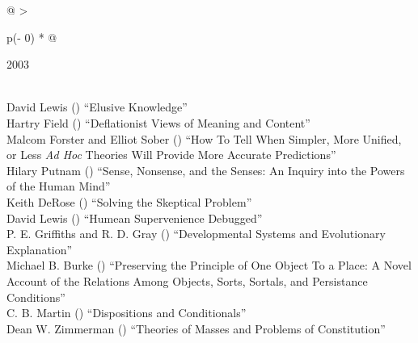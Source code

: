 \documentclass[
  10pt,
  letterpaper,
  DIV=11,
  numbers=noendperiod,
  twoside]{scrartcl}
\begin{document}
\begin{longtable}[]{@{}
  >{\raggedright\arraybackslash}p{(\columnwidth - 0\tabcolsep) * }@{}}

\caption{\label{tbl-top-ten-1994}Most cited articles published less than
ten years ago as of 2003.}

\tabularnewline

\toprule\noalign{}
\begin{minipage}[b]{\linewidth}\raggedright
2003
\end{minipage} \\
\midrule\noalign{}
\endhead
\bottomrule\noalign{}
\endlastfoot
David Lewis
()
``Elusive Knowledge'' \\
Hartry Field
()
``Deflationist Views of Meaning and Content'' \\
Malcom Forster and Elliot Sober
()
``How To Tell When Simpler, More Unified, or Less \emph{Ad Hoc} Theories
Will Provide More Accurate Predictions'' \\
Hilary Putnam
()
``Sense, Nonsense, and the Senses: An Inquiry into the Powers of the
Human Mind'' \\
Keith DeRose
()
``Solving the Skeptical Problem'' \\
David Lewis
()
``Humean Supervenience Debugged'' \\
P. E. Griffiths and R. D. Gray
()
``Developmental Systems and Evolutionary Explanation'' \\
Michael B. Burke
()
``Preserving the Principle of One Object To a Place: A Novel Account of
the Relations Among Objects, Sorts, Sortals, and Persistance
Conditions'' \\
C. B. Martin
()
``Dispositions and Conditionals'' \\
Dean W. Zimmerman
()
``Theories of Masses and Problems of Constitution'' \\

\end{longtable}
\end{document}
